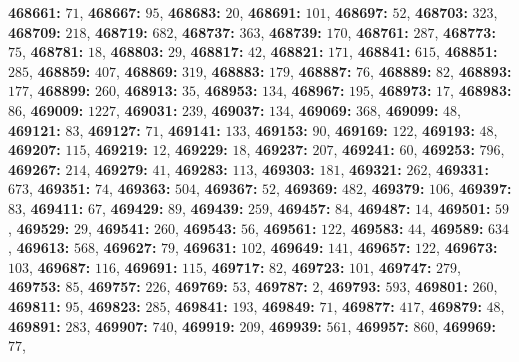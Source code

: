 \textsf{\bfseries 468661:} $71$, \textsf{\bfseries 468667:} $95$, \textsf{\bfseries 468683:} $20$, \textsf{\bfseries 468691:} $101$, \textsf{\bfseries 468697:} $52$, \textsf{\bfseries 468703:} $323$, \textsf{\bfseries 468709:} $218$, \textsf{\bfseries 468719:} $682$, \textsf{\bfseries 468737:} $363$, \textsf{\bfseries 468739:} $170$, \textsf{\bfseries 468761:} $287$, \textsf{\bfseries 468773:} $75$, \textsf{\bfseries 468781:} $18$, \textsf{\bfseries 468803:} $29$, \textsf{\bfseries 468817:} $42$, \textsf{\bfseries 468821:} $171$, \textsf{\bfseries 468841:} $615$, \textsf{\bfseries 468851:} $285$, \textsf{\bfseries 468859:} $407$, \textsf{\bfseries 468869:} $319$, \textsf{\bfseries 468883:} $179$, \textsf{\bfseries 468887:} $76$, \textsf{\bfseries 468889:} $82$, \textsf{\bfseries 468893:} $177$, \textsf{\bfseries 468899:} $260$, \textsf{\bfseries 468913:} $35$, \textsf{\bfseries 468953:} $134$, \textsf{\bfseries 468967:} $195$, \textsf{\bfseries 468973:} $17$, \textsf{\bfseries 468983:} $86$, \textsf{\bfseries 469009:} $1227$, \textsf{\bfseries 469031:} $239$, \textsf{\bfseries 469037:} $134$, \textsf{\bfseries 469069:} $368$, \textsf{\bfseries 469099:} $48$, \textsf{\bfseries 469121:} $83$, \textsf{\bfseries 469127:} $71$, \textsf{\bfseries 469141:} $133$, \textsf{\bfseries 469153:} $90$, \textsf{\bfseries 469169:} $122$, \textsf{\bfseries 469193:} $48$, \textsf{\bfseries 469207:} $115$, \textsf{\bfseries 469219:} $12$, \textsf{\bfseries 469229:} $18$, \textsf{\bfseries 469237:} $207$, \textsf{\bfseries 469241:} $60$, \textsf{\bfseries 469253:} $796$, \textsf{\bfseries 469267:} $214$, \textsf{\bfseries 469279:} $41$, \textsf{\bfseries 469283:} $113$, \textsf{\bfseries 469303:} $181$, \textsf{\bfseries 469321:} $262$, \textsf{\bfseries 469331:} $673$, \textsf{\bfseries 469351:} $74$, \textsf{\bfseries 469363:} $504$, \textsf{\bfseries 469367:} $52$, \textsf{\bfseries 469369:} $482$, \textsf{\bfseries 469379:} $106$, \textsf{\bfseries 469397:} $83$, \textsf{\bfseries 469411:} $67$, \textsf{\bfseries 469429:} $89$, \textsf{\bfseries 469439:} $259$, \textsf{\bfseries 469457:} $84$, \textsf{\bfseries 469487:} $14$, \textsf{\bfseries 469501:} $59$, \textsf{\bfseries 469529:} $29$, \textsf{\bfseries 469541:} $260$, \textsf{\bfseries 469543:} $56$, \textsf{\bfseries 469561:} $122$, \textsf{\bfseries 469583:} $44$, \textsf{\bfseries 469589:} $634$, \textsf{\bfseries 469613:} $568$, \textsf{\bfseries 469627:} $79$, \textsf{\bfseries 469631:} $102$, \textsf{\bfseries 469649:} $141$, \textsf{\bfseries 469657:} $122$, \textsf{\bfseries 469673:} $103$, \textsf{\bfseries 469687:} $116$, \textsf{\bfseries 469691:} $115$, \textsf{\bfseries 469717:} $82$, \textsf{\bfseries 469723:} $101$, \textsf{\bfseries 469747:} $279$, \textsf{\bfseries 469753:} $85$, \textsf{\bfseries 469757:} $226$, \textsf{\bfseries 469769:} $53$, \textsf{\bfseries 469787:} $2$, \textsf{\bfseries 469793:} $593$, \textsf{\bfseries 469801:} $260$, \textsf{\bfseries 469811:} $95$, \textsf{\bfseries 469823:} $285$, \textsf{\bfseries 469841:} $193$, \textsf{\bfseries 469849:} $71$, \textsf{\bfseries 469877:} $417$, \textsf{\bfseries 469879:} $48$, \textsf{\bfseries 469891:} $283$, \textsf{\bfseries 469907:} $740$, \textsf{\bfseries 469919:} $209$, \textsf{\bfseries 469939:} $561$, \textsf{\bfseries 469957:} $860$, \textsf{\bfseries 469969:} $77$, 
